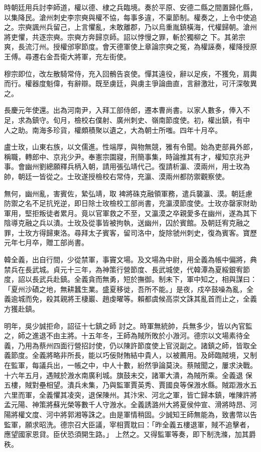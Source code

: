 \begin{pinyinscope}
 時朝廷用兵討李師道，權以德、棣之兵臨境。奏於平原、安德二縣之間置歸化縣，以集降民。滄州刺史李宗奭與權不協，每事多違，不稟節制。權奏之，上令中使追之。宗奭諷州兵留己，上言懼亂，未敢離郡，乃以烏重胤鎮橫海，代權歸朝。滄州將吏懼，共逐宗奭。宗奭方奔歸京師。詔以悖慢之罪，斬於獨柳之
 下。其弟宗爽，長流汀州。授權邠寧節度。會天德軍使上章論宗奭之冤，為權誣奏，權降授原王傅。尋遷右金吾衛大將軍，充左街使。



 穆宗即位，改左散騎常侍，充入回鶻告哀使。憚其遠役，辭以足疾，不獲免，肩輿而行。權器度魁偉，有辭辯。既至虜廷，與虜主爭論曲直，言辭激壯，可汗深敬異之。



 長慶元年使還。出為河南尹，入拜工部侍郎，遷本曹尚書。以家人數多，俸入不足，求為鎮守。旬月，檢校右僕射、廣州刺史、嶺南節度使。初，權出鎮，有中
 人之助。南海多珍貨，權頗積聚以遺之，大為朝士所嗤。四年十月卒。



 盧士玫，山東右族，以文儒進。性端厚，與物無競，雅有令聞。始為吏部員外郎，稱職，轉郎中、京兆少尹。奉憲宗園寢，刑簡事集，時論推其有才，權知京兆尹事。會幽州劉總願釋兵柄入朝，請用張弘靖代己。復請析瀛、漠兩州，用士玫為帥，朝廷一皆從之。士玫遂授檢校右常侍，充瀛、漠兩州都防禦觀察使。



 無何，幽州亂，害賓佐，縶弘靖，取
 裨將硃克融領軍務，遣兵襲瀛、漠。朝廷慮防禦之名不足抗兇逆，即日除士玫檢校工部尚書，充瀛漠節度使。士玫亦罄家財助軍用，堅拒叛徒者累月。竟以官軍救之不至，又瀛漠之卒親愛多在幽州，遂為其下陰導克融之兵以潰。士玫及從事皆被拘執，送幽州，囚於賓館。及朝廷宥克融之罪，士玫方得歸東洛。尋拜太子賓客，留司洛中，旋除虢州刺史，復為賓客。寶歷元年七月卒，贈工部尚書。



 韓全義，出自行間，少從禁軍，事竇文場。及文場為中尉，用全義為帳中偏將，典禁兵在長武城。貞元十三年，為神策行營節度、長武城使，代韓潭為夏綏銀宥節度，詔以長武兵赴鎮。全義貪而無勇，短於撫御。制未下，軍中知之，相與謀曰：「夏州沙磧之地，無耕蠶生業。盛夏移徙，吾所不能。」是夜，戍卒鼓噪為亂，全義逾城而免，殺其親將王棲巖、趙虔曜等。賴都虞候高崇文誅其亂首而止之，全義方獲赴鎮。



 明年，吳少誠拒命，詔征十七鎮之師
 討之。時軍無統帥，兵無多少，皆以內官監之，師之進退不由主將。十五年冬，王師為賊所敗於小溵河。德宗以文場素待全義，乃用為蔡州四面行營招討使，仍以陳許節度使上官涚副之。諸鎮之師，皆取全義節度。全義將略非所長，能以巧佞財賄結中貴人，以被薦用。及師臨賊境，又制在監軍，每議兵出，一帳之中，中人十數，紛然爭論莫決。蔡賊聞之，屢求決戰。十六年五月，遇賊於溵水南廣利城。旗鼓未交，諸軍大潰，為賊所乘。全義退
 保五樓，賊對壘相望。潰兵未集，乃與監軍賈英秀、賈國良等保溵水縣。賊距溵水五六里而軍，全義懼其凌突，退保陳州。其汴宋、河北之軍，皆亡歸本鎮，唯陳許將孟元陽、神策將蘇光榮等數千人守溵水。全義誘潞州大將夏侯仲宣、滑將時昂、河陽將權文度、河中將郭湘等誅之。由是軍情稍固。少誠知王師無能為，致書幣以告監軍，願求昭洗。德宗召大臣議，宰相賈耽曰：「昨全義五樓退軍，賊不追擊者，應望國家恩貸。臣伏恐須開生路。」
 上然之。又得監軍等奏，即下制洗滌，加其爵秩。




\end{pinyinscope}
